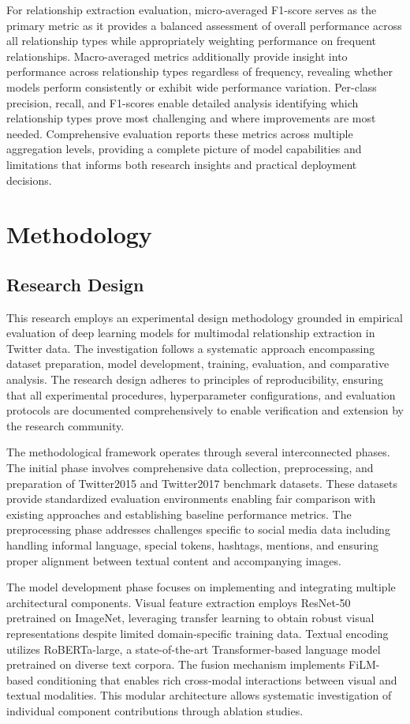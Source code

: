 \documentclass[12pt,a4paper]{report}
\begin{document}
For relationship extraction evaluation, micro-averaged F1-score serves as the primary metric as it provides a balanced assessment of overall performance across all relationship types while appropriately weighting performance on frequent relationships. Macro-averaged metrics additionally provide insight into performance across relationship types regardless of frequency, revealing whether models perform consistently or exhibit wide performance variation. Per-class precision, recall, and F1-scores enable detailed analysis identifying which relationship types prove most challenging and where improvements are most needed. Comprehensive evaluation reports these metrics across multiple aggregation levels, providing a complete picture of model capabilities and limitations that informs both research insights and practical deployment decisions.

\chapter{Methodology}

\section{Research Design}

This research employs an experimental design methodology grounded in empirical evaluation of deep learning models for multimodal relationship extraction in Twitter data. The investigation follows a systematic approach encompassing dataset preparation, model development, training, evaluation, and comparative analysis. The research design adheres to principles of reproducibility, ensuring that all experimental procedures, hyperparameter configurations, and evaluation protocols are documented comprehensively to enable verification and extension by the research community.

The methodological framework operates through several interconnected phases. The initial phase involves comprehensive data collection, preprocessing, and preparation of Twitter2015 and Twitter2017 benchmark datasets. These datasets provide standardized evaluation environments enabling fair comparison with existing approaches and establishing baseline performance metrics. The preprocessing phase addresses challenges specific to social media data including handling informal language, special tokens, hashtags, mentions, and ensuring proper alignment between textual content and accompanying images.

The model development phase focuses on implementing and integrating multiple architectural components. Visual feature extraction employs ResNet-50 pretrained on ImageNet, leveraging transfer learning to obtain robust visual representations despite limited domain-specific training data. Textual encoding utilizes RoBERTa-large, a state-of-the-art Transformer-based language model pretrained on diverse text corpora. The fusion mechanism implements FiLM-based conditioning that enables rich cross-modal interactions between visual and textual modalities. This modular architecture allows systematic investigation of individual component contributions through ablation studies.
\end{document}
